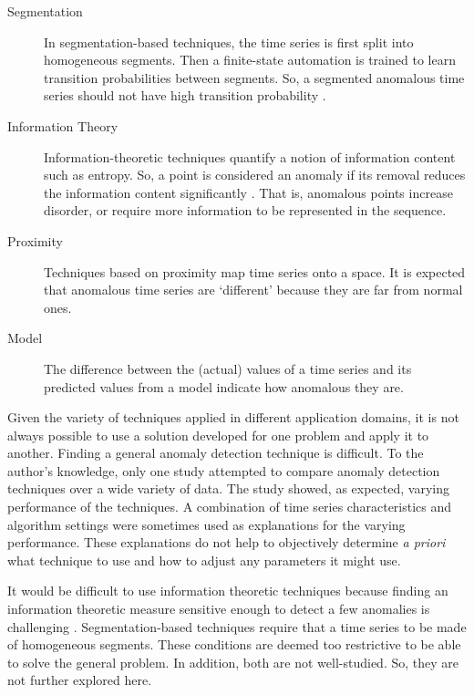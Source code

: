 \begin{description}

\item[Segmentation] In segmentation-based techniques, the time series is first split into homogeneous segments. Then a finite-state automation is trained to learn transition probabilities between segments. So, a segmented anomalous time series should not have high transition probability \cite{Salvador2005,mahoney2005trajectory,Chan2005}.

\item[Information Theory] Information-theoretic techniques quantify a notion of information content such as entropy. So, a point is considered an anomaly if its removal reduces the information content significantly \cite{Muthukrishnan2004,jagadish1999mining}. That is, anomalous points increase disorder, or require more information to be represented in the sequence.

\item[Proximity] Techniques based on proximity map time series onto a space. It is expected that anomalous time series are `different' because they are far from normal ones.

\item[Model] The difference between the (actual) values of a time series and its predicted values from a model indicate how anomalous they are.
 
\end{description}


Given the variety of techniques applied in different application domains, it is not always possible to use a solution developed for one problem and apply it to another. Finding a general anomaly detection technique is difficult. To the author's knowledge, only one study \cite{Cheboli2010} attempted to compare anomaly detection techniques over a wide variety of data. The study showed, as expected, varying performance of the techniques. A combination of time series characteristics and algorithm settings were sometimes used as explanations for the varying performance. These explanations do not help to objectively determine \emph{a priori} what technique to use and how to adjust any parameters it might use.

It would be difficult to use information theoretic techniques because finding an information theoretic measure sensitive enough to detect a few anomalies is challenging \cite{Chandola2009}. Segmentation-based techniques require that a time series to be made of homogeneous segments. These conditions are deemed too restrictive to be able to solve the general problem. In addition, both are not well-studied. So, they are not further explored here.

